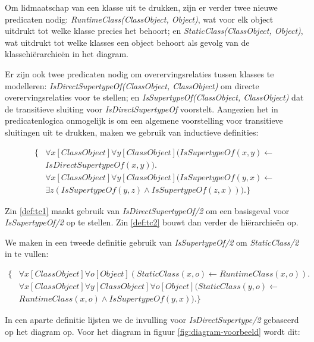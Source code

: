 Om lidmaatschap van een klasse uit te drukken, zijn er verder twee nieuwe predicaten nodig: \textit{RuntimeClass(ClassObject, Object)}, wat voor elk object uitdrukt tot welke klasse precies het behoort; en \textit{StaticClass(ClassObject, Object)}, wat uitdrukt tot welke klasses een object behoort als gevolg van de klassehi\"erarchie\"en in het diagram.

Er zijn ook twee predicaten nodig om overervingsrelaties tussen klasses te modelleren: \textit{IsDirectSupertypeOf(ClassObject, ClassObject)} om directe overervingsrelaties voor te stellen; en \textit{IsSupertypeOf(ClassObject, ClassObject)} dat de transitieve sluiting voor \textit{IsDirectSupertypeOf} voorstelt. Aangezien het in predicatenlogica onmogelijk is om een algemene voorstelling voor transitieve sluitingen uit te drukken, maken we gebruik van inductieve definities\cite{DeCatBroes2014PLaa}:

\begin{align}
\{
\nonumber &\forall{x}[ClassObject]\forall{y}[ClassObject](\mathit{IsSupertypeOf}(x,y) \leftarrow \\ &\mathit{IsDirectSupertypeOf}(x,y)).\label{def:tc1} \\
\nonumber &\forall{x}[ClassObject]\forall{y}[ClassObject](\mathit{IsSupertypeOf}(y,x) \leftarrow \\
&\exists{z}(\mathit{IsSupertypeOf(y,z)} \land \mathit{IsSupertypeOf}(z,x))).\label{def:tc2}
\}
\end{align}

\sloppy Zin \ref{def:tc1} maakt gebruik van \textit{IsDirectSupertypeOf/2} om een basisgeval voor \\ \textit{IsSupertypeOf/2} op te stellen. Zin \ref{def:tc2} bouwt dan verder de hi\"erarchie\"en op.

We maken in een tweede definitie gebruik van \textit{IsSupertypeOf/2} om \textit{StaticClass/2} in te vullen:

\begin{align*}
\{
&\forall{x}[ClassObject]\forall{o}[Object](StaticClass(x,o) \leftarrow RuntimeClass(x,o)). \\
&\forall{x}[ClassObject]\forall{y}[ClassObject]\forall{o}[Object](StaticClass(y,o) \leftarrow \\ &RuntimeClass(x,o) \land \mathit{IsSupertypeOf}(y,x)).
\}
\end{align*}

In een aparte definitie lijsten we de invulling voor \textit{IsDirectSupertype/2} gebaseerd op het diagram op. Voor het diagram in figuur \ref{fig:diagram-voorbeeld} wordt dit:

